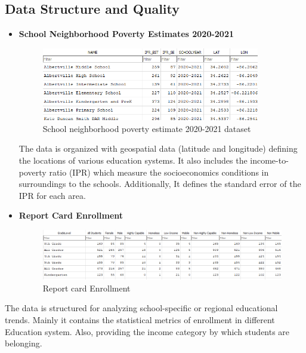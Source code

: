 \documentclass[a4paper,11pt]{article}
\begin{document}
    \subsection{Data Structure and Quality}
        \begin{itemize}
            \item \textbf{School Neighborhood Poverty Estimates 2020-2021} 
            \begin{figure}[ht!]
                \centering
                \includegraphics[width=0.9\textwidth]{images/SchoolNeighborhoodPovertyData.png}
                \caption{School neighborhood poverty estimate 2020-2021 dataset}
                \label{fig:dataset1}
            \end{figure}
            
            The data is organized with geospatial data (latitude and longitude) defining the locations of various education systems. It also includes the income-to-poverty ratio (IPR) which measure the socioeconomics conditions in surroundings to the schools. Additionally, It defines the standard error of the IPR for each area.
            
\newpage
            \item \textbf{Report Card Enrollment} 
            \begin{figure}[h!]
                \centering
                \includegraphics[width=0.9\linewidth]{images/ReportCardEnrollmentData.png}
                \caption{Report card Enrollment}
                \label{fig:dataset2}
            \end{figure}
        \end{itemize} The data is structured for analyzing school-specific or regional educational trends. Mainly it contains the statistical metrics of enrollment in different Education system. Also, providing the income category by which students are belonging. 
\end{document}
